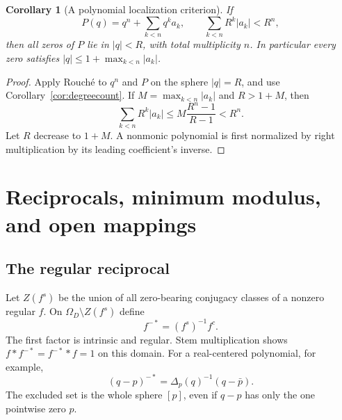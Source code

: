 \documentclass[11pt,a4paper]{article}
\numberwithin{equation}{section}
\newtheorem{corollary}[theorem]{Corollary}
\theoremstyle{definition}
\theoremstyle{remark}
\begin{document}
\begin{corollary}[A polynomial localization criterion]
If
\[
 P(q)=q^n+\sum_{k<n}q^k a_k,
 \qquad \sum_{k<n}R^k|a_k|<R^n,
\]
then all zeros of $P$ lie in $|q|<R$, with total multiplicity $n$.
In particular every zero satisfies
$|q|\le1+\max_{k<n}|a_k|$.
\end{corollary}
\begin{proof}
Apply Rouch\'e to $q^n$ and $P$ on the sphere $|q|=R$, and use
Corollary~\ref{cor:degreecount}. If $M=\max_{k<n}|a_k|$ and $R>1+M$, then
\[
 \sum_{k<n}R^k|a_k|\le M\frac{R^n-1}{R-1}<R^n.
\]
Let $R$ decrease to $1+M$. A nonmonic polynomial is first normalized by
right multiplication by its leading coefficient's inverse.
\end{proof}

\section{Reciprocals, minimum modulus, and open mappings}
\label{sec:reciprocal}
\subsection{The regular reciprocal}
Let $Z(f^s)$ be the union of all zero-bearing conjugacy classes of a nonzero
regular $f$. On $\Omega_D\setminus Z(f^s)$ define
\begin{equation}
 f^{-*}=(f^s)^{-1}f^c.
 \label{eq:reciprocal}
\end{equation}
The first factor is intrinsic and regular. Stem multiplication shows
$f*f^{-*}=f^{-*}*f=1$ on this domain. For a real-centered polynomial, for
example,
\[
 (q-p)^{-*}=\Delta_p(q)^{-1}(q-\bar p).
\]
The excluded set is the whole sphere $[p]$, even if $q-p$ has only the one
pointwise zero $p$.
\end{document}

